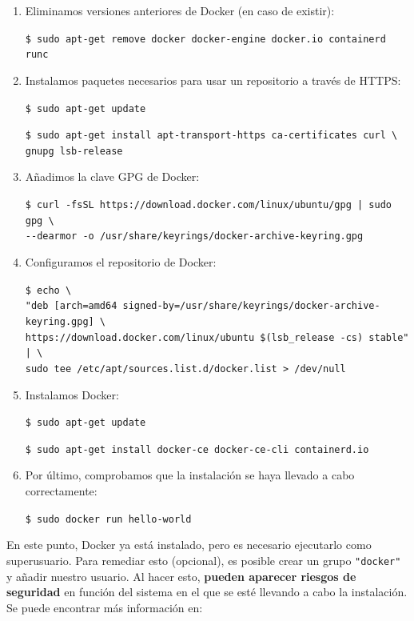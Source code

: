 \begin{enumerate}
\item Eliminamos versiones anteriores de Docker (en caso de existir):

\texttt{\$ sudo apt-get remove docker docker-engine docker.io containerd runc}

\item Instalamos paquetes necesarios para usar un repositorio a través de HTTPS:

\texttt{\$ sudo apt-get update}

\texttt{\$ sudo apt-get install apt-transport-https ca-certificates curl \textbackslash \\ gnupg lsb-release}

\item Añadimos la clave GPG de Docker:

\texttt{\$ curl -fsSL https://download.docker.com/linux/ubuntu/gpg | sudo gpg \textbackslash \\ {-}{-}dearmor -o /usr/share/keyrings/docker-archive-keyring.gpg}

\item Configuramos el repositorio de Docker:

\texttt{\$ echo \textbackslash \\ 
"deb [arch=amd64 signed-by=/usr/share/keyrings/docker-archive-keyring.gpg] \textbackslash \\ 
https://download.docker.com/linux/ubuntu \$(lsb{\_}release -cs) stable"{ }| \textbackslash \\ sudo tee /etc/apt/sources.list.d/docker.list >{ }/dev/null}

\item Instalamos Docker:

\texttt{\$ sudo apt-get update}

\texttt{\$ sudo apt-get install docker-ce docker-ce-cli containerd.io}

\item Por último, comprobamos que la instalación se haya llevado a cabo correctamente:

\texttt{\$ sudo docker run hello-world}


\end{enumerate}

En este punto, Docker ya está instalado, pero es necesario ejecutarlo como superusuario. Para remediar esto (opcional), es posible crear un grupo \texttt{"docker"} y añadir nuestro usuario. Al hacer esto, \textbf{pueden aparecer riesgos de seguridad} en función del sistema en el que se esté llevando a cabo la instalación. Se puede encontrar más información en:

